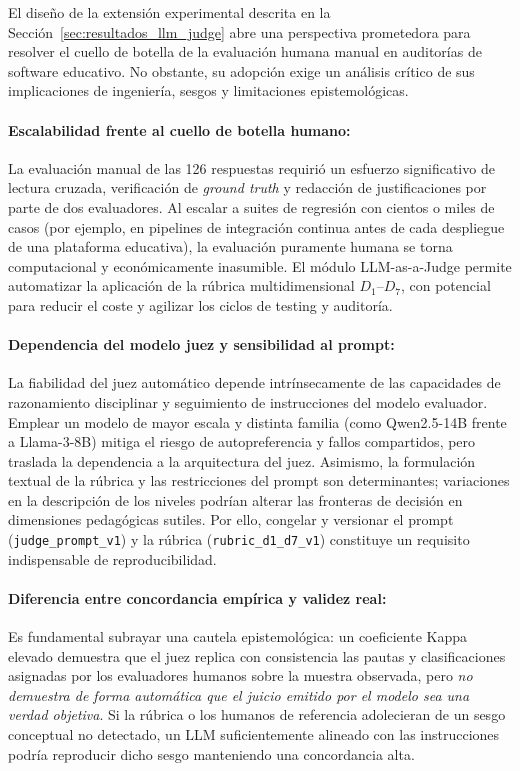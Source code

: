 El diseño de la extensión experimental descrita en la Sección~\ref{sec:resultados_llm_judge} abre una perspectiva prometedora para resolver el cuello de botella de la evaluación humana manual en auditorías de software educativo. No obstante, su adopción exige un análisis crítico de sus implicaciones de ingeniería, sesgos y limitaciones epistemológicas.

\paragraph{Escalabilidad frente al cuello de botella humano:}
La evaluación manual de las 126 respuestas requirió un esfuerzo significativo de lectura cruzada, verificación de \textit{ground truth} y redacción de justificaciones por parte de dos evaluadores. Al escalar a suites de regresión con cientos o miles de casos (por ejemplo, en pipelines de integración continua antes de cada despliegue de una plataforma educativa), la evaluación puramente humana se torna computacional y económicamente inasumible. El módulo LLM-as-a-Judge permite automatizar la aplicación de la rúbrica multidimensional $D_1$--$D_7$, con potencial para reducir el coste y agilizar los ciclos de testing y auditoría.

\paragraph{Dependencia del modelo juez y sensibilidad al prompt:}
La fiabilidad del juez automático depende intrínsecamente de las capacidades de razonamiento disciplinar y seguimiento de instrucciones del modelo evaluador. Emplear un modelo de mayor escala y distinta familia (como Qwen2.5-14B frente a Llama-3-8B) mitiga el riesgo de autopreferencia y fallos compartidos, pero traslada la dependencia a la arquitectura del juez. Asimismo, la formulación textual de la rúbrica y las restricciones del prompt son determinantes; variaciones en la descripción de los niveles podrían alterar las fronteras de decisión en dimensiones pedagógicas sutiles. Por ello, congelar y versionar el prompt (\texttt{judge\_prompt\_v1}) y la rúbrica (\texttt{rubric\_d1\_d7\_v1}) constituye un requisito indispensable de reproducibilidad.

\paragraph{Diferencia entre concordancia empírica y validez real:}
Es fundamental subrayar una cautela epistemológica: un coeficiente Kappa elevado demuestra que el juez replica con consistencia las pautas y clasificaciones asignadas por los evaluadores humanos sobre la muestra observada, pero \textit{no demuestra de forma automática que el juicio emitido por el modelo sea una verdad objetiva}. Si la rúbrica o los humanos de referencia adolecieran de un sesgo conceptual no detectado, un LLM suficientemente alineado con las instrucciones podría reproducir dicho sesgo manteniendo una concordancia alta.

